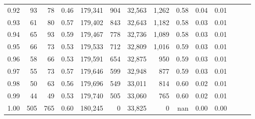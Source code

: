 \begin{tabular}{rrrrrrrrrrrrrr}
0.92 &     93 &   78 &  0.46 &  179,341 &      904 &  32,563 &   1,262 &  0.58 &  0.04 &      0.01 \\
0.93 &     61 &   80 &  0.57 &  179,402 &      843 &  32,643 &   1,182 &  0.58 &  0.03 &      0.01 \\
0.94 &     65 &   93 &  0.59 &  179,467 &      778 &  32,736 &   1,089 &  0.58 &  0.03 &      0.01 \\
0.95 &     66 &   73 &  0.53 &  179,533 &      712 &  32,809 &   1,016 &  0.59 &  0.03 &      0.01 \\
0.96 &     58 &   66 &  0.53 &  179,591 &      654 &  32,875 &     950 &  0.59 &  0.03 &      0.01 \\
0.97 &     55 &   73 &  0.57 &  179,646 &      599 &  32,948 &     877 &  0.59 &  0.03 &      0.01 \\
0.98 &     50 &   63 &  0.56 &  179,696 &      549 &  33,011 &     814 &  0.60 &  0.02 &      0.01 \\
0.99 &     44 &   49 &  0.53 &  179,740 &      505 &  33,060 &     765 &  0.60 &  0.02 &      0.01 \\
1.00 &    505 &  765 &  0.60 &  180,245 &        0 &  33,825 &       0 &   nan &  0.00 &      0.00 \\
\bottomrule
\end{tabular}
